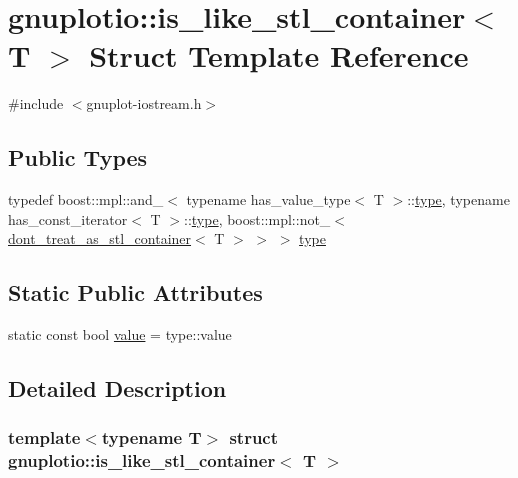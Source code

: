 \hypertarget{structgnuplotio_1_1is__like__stl__container}{}\section{gnuplotio\+:\+:is\+\_\+like\+\_\+stl\+\_\+container$<$ T $>$ Struct Template Reference}
\label{structgnuplotio_1_1is__like__stl__container}


{\ttfamily \#include $<$gnuplot-\/iostream.\+h$>$}

\subsection*{Public Types}
\begin{DoxyCompactItemize}
\item 
typedef boost\+::mpl\+::and\+\_\+$<$ typename has\+\_\+value\+\_\+type$<$ T $>$\+::\hyperlink{structgnuplotio_1_1is__like__stl__container_a050ecfa55e896a27f86d901334f47c6a}{type}, typename has\+\_\+const\+\_\+iterator$<$ T $>$\+::\hyperlink{structgnuplotio_1_1is__like__stl__container_a050ecfa55e896a27f86d901334f47c6a}{type}, boost\+::mpl\+::not\+\_\+$<$ \hyperlink{structgnuplotio_1_1dont__treat__as__stl__container}{dont\+\_\+treat\+\_\+as\+\_\+stl\+\_\+container}$<$ T $>$ $>$ $>$ \hyperlink{structgnuplotio_1_1is__like__stl__container_a050ecfa55e896a27f86d901334f47c6a}{type}
\end{DoxyCompactItemize}
\subsection*{Static Public Attributes}
\begin{DoxyCompactItemize}
\item 
static const bool \hyperlink{structgnuplotio_1_1is__like__stl__container_ae4761e6e807deed732e41118c785c8a4}{value} = type\+::value
\end{DoxyCompactItemize}


\subsection{Detailed Description}
\subsubsection*{template$<$typename T$>$\newline
struct gnuplotio\+::is\+\_\+like\+\_\+stl\+\_\+container$<$ T $>$}



